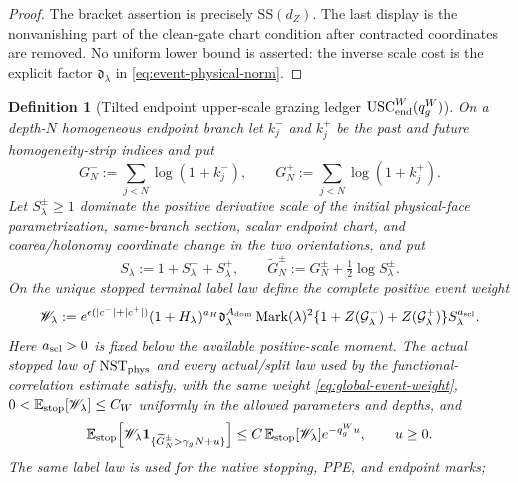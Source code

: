 \documentclass[11pt]{article}
\newtheorem{definition}[theorem]{Definition}
\newcommand{\one}{\mathbf 1}
\begin{document}
\begin{proof}
The bracket assertion is precisely $\mathrm{SS}(d_Z)$.  The last display is
the nonvanishing part of the clean-gate chart condition after contracted
coordinates are removed.  No uniform lower bound is asserted: the inverse
scale cost is the explicit factor $\mathfrak d_\lambda$ in
\eqref{eq:event-physical-norm}.
\end{proof}

\begin{definition}[Tilted endpoint upper-scale grazing ledger
$\mathrm{USC}_{\rm end}^{W}(q_g^W)$]
\label{def:endpoint-upper-scale}
On a depth-$N$ homogeneous endpoint branch let $k_j^-$ and $k_j^+$ be the
past and future homogeneity-strip indices and put
\begin{equation}
\label{eq:homogeneity-log-marks}
 G_N^-:=\sum_{j<N}\log(1+k_j^-),\qquad
 G_N^+:=\sum_{j<N}\log(1+k_j^+).
\end{equation}
Let $S_\lambda^\pm\ge1$ dominate the positive derivative scale of the initial
physical-face parametrization, same-branch section, scalar endpoint chart,
and coarea/holonomy coordinate change in the two orientations, and put
\begin{equation}
\label{eq:augmented-homogeneity-mark}
 S_\lambda:=1+S_\lambda^-+S_\lambda^+,
 \qquad
 \widetilde G_N^\pm:=G_N^\pm+\tfrac12\log S_\lambda^\pm.
\end{equation}
On the unique stopped terminal label law define the complete positive event
weight
\begin{equation}
\label{eq:global-event-weight}
 \mathscr W_\lambda:=
 e^{\epsilon(|c^-|+|c^+|)}(1+H_\lambda)^{a_H}
 \mathfrak d_\lambda^{A_{\rm dom}}
 \operatorname{Mark}(\lambda)^2
 \{1+Z(\mathcal G_\lambda^-)+Z(\mathcal G_\lambda^+)\}
 S_\lambda^{a_{\rm scl}}.
\end{equation}
Here $a_{\rm scl}>0$ is fixed below the available positive-scale moment.
The actual stopped law of $\mathrm{NST}_{\rm phys}$ and every actual/split
law used by the functional-correlation estimate satisfy, with the
\emph{same} weight \eqref{eq:global-event-weight},
$0<\mathbb E_{\rm stop}[\mathscr W_\lambda]\le C_W$ uniformly in the
allowed parameters and depths, and
\begin{equation}
\label{eq:upper-scale-excess-tail}
 \mathbb E_{\rm stop}\!\left[
  \mathscr W_\lambda
  \one_{\{\widetilde G_N^\pm>\gamma_gN+u\}}\right]
 \le C\,\mathbb E_{\rm stop}[\mathscr W_\lambda]
 e^{-q_g^Wu},\qquad u\ge0.
\end{equation}
The same label law is used for the native stopping, PPE, and endpoint marks;

\end{definition}
\end{document}
